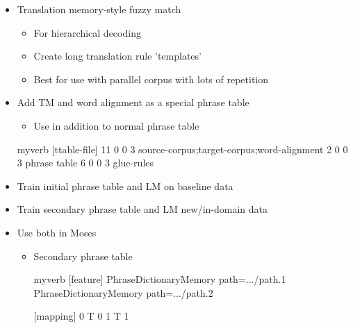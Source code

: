 \documentclass[landscape]{uedslides2C}
\begin{document}



\begin{itemize} \itemsep -1mm
\item Translation memory-style fuzzy match
  \begin{itemize}
  \item For hierarchical decoding
  \item Create long translation rule 'templates'
  \item Best for use with parallel corpus with lots of repetition
  \end{itemize}

\item Add TM and word alignment as a special phrase table
  \begin{itemize}
    \item Use in addition to normal phrase table
  \end{itemize}
  \begin{SaveVerbatim}{myverb} 
   [ttable-file]
   11 0 0 3 source-corpus;target-corpus;word-alignment 
   2 0 0 3 phrase table
   6 0 0 3 glue-rules
  \end{SaveVerbatim}
  \colorbox{gray}{}

\end{itemize}


\begin{itemize} \itemsep -1mm
\item Train initial phrase table and LM on baseline data

\item Train secondary phrase table and LM new/in-domain data

\item Use both in Moses
  \begin{itemize}

  \item Secondary phrase table
  \begin{SaveVerbatim}{myverb} 
    [feature]
    PhraseDictionaryMemory path=.../path.1
    PhraseDictionaryMemory path=.../path.2
    
    [mapping]
    0 T 0
    1 T 1
  \end{SaveVerbatim}
  \colorbox{gray}{}

  \end{itemize}
\end{itemize}
\end{document}
